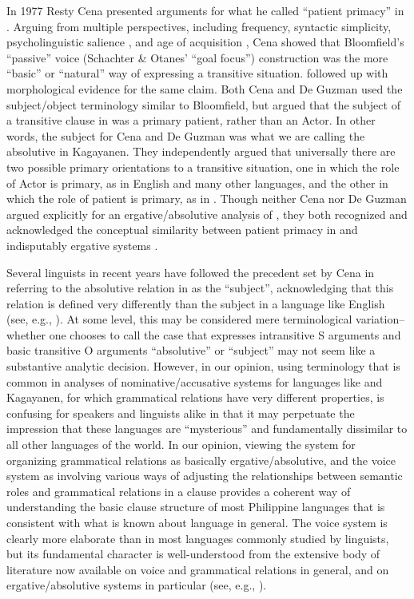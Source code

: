 In 1977 Resty Cena presented arguments for what he called “patient primacy” in  \citep{cena1977}. Arguing from multiple perspectives, including frequency, syntactic simplicity, psycholinguistic salience \citep{tucker1971}, and age of acquisition \citep{segalowitz1978}, Cena showed that Bloomfield’s “passive” voice (Schachter \& Otanes’ “goal focus”) construction was the more “basic” or “natural” way of expressing a transitive situation. \citet{deguzman1992} followed up with morphological evidence for the same claim. Both Cena and De Guzman used the subject/object terminology similar to Bloomfield, but argued that the subject of a transitive clause in  was a primary patient, rather than an Actor. In other words, the subject for Cena and De Guzman was what we are calling the absolutive in Kagayanen. They independently argued that universally there are two possible primary orientations to a transitive situation, one in which the role of Actor is primary, as in English and many other languages, and the other in which the role of patient is primary, as in . Though neither Cena nor De Guzman argued explicitly for an ergative/absolutive analysis of , they both recognized and acknowledged the conceptual similarity between patient primacy in  and indisputably ergative systems \citep[87]{deguzman1992}.

Several linguists in recent years have followed the precedent set by Cena in referring to the absolutive relation in  as the “subject”, acknowledging that this relation is defined very differently than the subject in a language like English (see, e.g., \citealt{himmelmann1991, kroeger1993, kaufman2009}). At some level, this may be considered mere terminological variation--whether one chooses to call the case that expresses intransitive S arguments and basic transitive O arguments “absolutive” or “subject” may not seem like a substantive analytic decision. However, in our opinion, using terminology that is common in analyses of nominative/accusative systems for languages like  and Kagayanen, for which grammatical relations have very different properties, is confusing for speakers and linguists alike in that it may perpetuate the impression that these languages are “mysterious” and fundamentally dissimilar to all other languages of the world. In our opinion, viewing the system for organizing grammatical relations as basically ergative/absolutive, and the voice system as involving various ways of adjusting the relationships between semantic roles and grammatical relations in a clause provides a coherent way of understanding the basic clause structure of most Philippine languages that is consistent with what is known about language in general. The voice system is clearly more elaborate than in most languages commonly studied by linguists, but its fundamental character is well-understood from the extensive body of literature now available on voice and grammatical relations in general, and on ergative/absolutive systems in particular (see, e.g., \citealt{comrie1989, dixon1994, payne1997, dixon2000, bahrt2021}).

